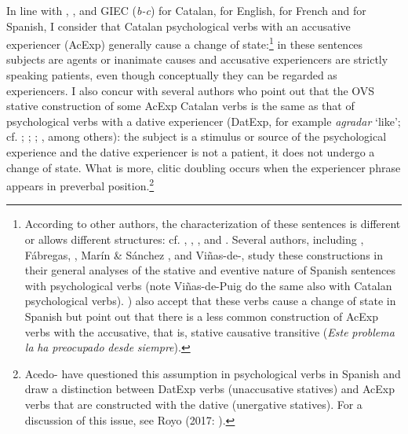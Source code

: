 \documentclass[output=paper,modfonts,nonflat]{langsci/langscibook}
\begin{document}
In line with \citet{Ynglès1991}, \citet{CabréMateu1998}, \citet{Rosselló2008} and GIEC (\textit{b-c}) for Catalan, \citet{Pesetsky1995} for English, \citet{Bouchard1995} for French and \citet{Acedo-MatellánMateu2015} for Spanish, I consider that Catalan psychological verbs with an accusative experiencer (AcExp) generally cause a change of state:\footnote{According to other authors, the characterization of these sentences is different or allows different structures: cf. \citet{Voorst1992}, \citet{Arad1999}, \citet{Landau2010}, \citet{MarínMcNally2011} and \citet{Fábregas2015}. Several authors, including \citet{FábregasMarín2012}, Fábregas, \citet{MarínMcNally2012}, Marín \& Sánchez \citet{Marco2012}, \citet{Ganeshan2014} and Viñas-de-\citet{Puig2014}, study these constructions in their general analyses of the stative and eventive nature of Spanish sentences with psychological verbs (note Viñas-de-Puig do the same also with Catalan psychological verbs). \citet[83]{Acedo-MatellánMateu2015} ) also accept that these verbs cause a change of state in Spanish but point out that there is a less common construction of AcExp verbs with the accusative, that is, stative causative transitive (\textit{Este} \textit{problema} \textit{la} \textit{ha} \textit{preocupado} \textit{desde} \textit{siempre}).} in these sentences subjects are agents or inanimate causes and accusative experiencers are strictly speaking patients, even though conceptually they can be regarded as experiencers. I also concur with several authors who point out that the OVS stative construction of some AcExp Catalan verbs is the same as that of psychological verbs with a dative experiencer (DatExp, for example \textit{agradar} ‘like’; cf. \citealt{CabréMateu1998}; \citealt{Ramos2004}; \citealt{Rosselló2008}; \citealt{Cuervo2010}, among others): the subject is a stimulus or source of the psychological experience and the dative experiencer is not a patient, it does not undergo a change of state. What is more, clitic doubling occurs when the experiencer phrase appears in preverbal position.\footnote{Acedo-\citet{MatellánMateu2015} have questioned this assumption in psychological verbs in Spanish and draw a distinction between DatExp verbs (unaccusative statives) and AcExp verbs that are constructed with the dative (unergative statives). For a discussion of this issue, see Royo (2017: ).}
\end{document}
